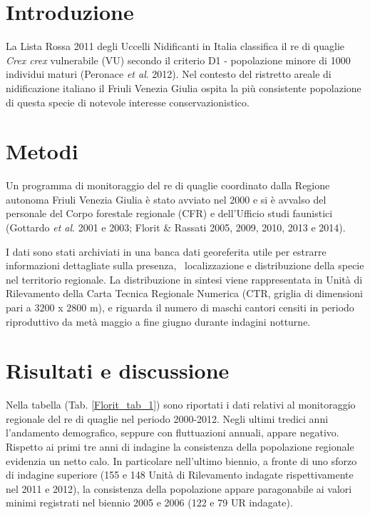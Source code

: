\section*{Introduzione}
La Lista Rossa 2011 degli Uccelli Nidificanti in Italia classifica il re di quaglie \textit{Crex crex} vulnerabile (VU) secondo il criterio D1 - popolazione minore di 1000 individui maturi (Peronace \textit{et al}. 2012). Nel contesto del ristretto areale di nidificazione italiano il Friuli Venezia Giulia ospita la più consistente popolazione di questa specie di notevole interesse conservazionistico. 


\section*{Metodi}
Un programma di monitoraggio del re di quaglie coordinato dalla Regione autonoma Friuli Venezia Giulia è stato avviato nel 2000 e si è avvalso del personale del Corpo forestale regionale (CFR) e dell{\textquoteright}Ufficio studi faunistici (Gottardo \textit{et al}. 2001 e 2003; Florit \& Rassati 2005, 2009, 2010, 2013 e 2014).

I dati sono stati archiviati in una banca dati georeferita utile per estrarre informazioni dettagliate sulla presenza,
\ localizzazione e distribuzione della specie nel territorio regionale. La distribuzione in sintesi viene rappresentata in Unità di Rilevamento della Carta Tecnica Regionale Numerica (CTR, griglia di dimensioni pari a $3200$ x $2800$ m), e riguarda il numero di maschi cantori censiti in periodo riproduttivo da metà maggio a fine giugno durante indagini notturne.


\section*{Risultati e discussione}
Nella tabella (Tab. \ref{Florit_tab_1}) sono riportati i dati relativi al monitoraggio regionale del re di quaglie nel periodo 2000-2012. 
Negli ultimi tredici anni l{\textquoteright}andamento demografico, seppure con fluttuazioni annuali, appare negativo. Rispetto ai primi tre anni di indagine la consistenza della popolazione regionale evidenzia un netto calo. In particolare nell{\textquoteright}ultimo biennio, a fronte di uno sforzo di indagine superiore (155 e 148 Unità di Rilevamento indagate rispettivamente nel 2011 e 2012), la consistenza della popolazione appare paragonabile ai valori minimi registrati nel biennio 2005 e 2006 (122 e 79 UR indagate). 

